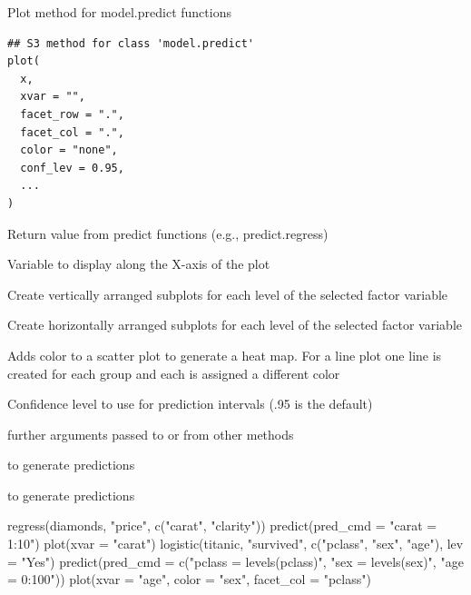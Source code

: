 \documentclass[a4paper]{book}
\begin{document}
%
\begin{Description}
Plot method for model.predict functions
\end{Description}
%
\begin{Usage}
\begin{verbatim}
## S3 method for class 'model.predict'
plot(
  x,
  xvar = "",
  facet_row = ".",
  facet_col = ".",
  color = "none",
  conf_lev = 0.95,
  ...
)
\end{verbatim}
\end{Usage}
%
\begin{Arguments}
\begin{ldescription}
\item[\code{x}] Return value from predict functions (e.g., predict.regress)

\item[\code{xvar}] Variable to display along the X-axis of the plot

\item[\code{facet\_row}] Create vertically arranged subplots for each level of the selected factor variable

\item[\code{facet\_col}] Create horizontally arranged subplots for each level of the selected factor variable

\item[\code{color}] Adds color to a scatter plot to generate a heat map. For a line plot one line is created for each group and each is assigned a different color

\item[\code{conf\_lev}] Confidence level to use for prediction intervals (.95 is the default)

\item[\code{...}] further arguments passed to or from other methods
\end{ldescription}
\end{Arguments}
%
\begin{SeeAlso}
 to generate predictions

 to generate predictions
\end{SeeAlso}
%
\begin{Examples}
\begin{ExampleCode}
regress(diamonds, "price", c("carat", "clarity")) %
  predict(pred_cmd = "carat = 1:10") %
  plot(xvar = "carat")
logistic(titanic, "survived", c("pclass", "sex", "age"), lev = "Yes") %
  predict(pred_cmd = c("pclass = levels(pclass)", "sex = levels(sex)", "age = 0:100")) %
  plot(xvar = "age", color = "sex", facet_col = "pclass")

\end{ExampleCode}
\end{Examples}
\end{document}
